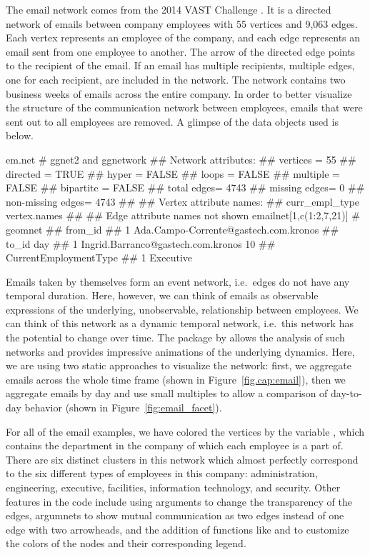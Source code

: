The email network comes from the 2014 VAST Challenge \citep{emailnet}. It is a directed network of emails between company employees with 55 vertices and 9,063 edges. Each vertex represents an employee of the company, and each edge represents an email sent from one employee to another. The arrow of the directed edge points to the recipient of the email. If an email has multiple recipients, multiple edges, one for each recipient, are included in the network. The network contains two business weeks of emails across the entire company. In order to better visualize the structure of the communication network between employees, emails that were sent out to all employees are removed. A glimpse of the data objects used is below. 

\begin{example}
em.net # ggnet2 and ggnetwork
##  Network attributes:
##   vertices = 55 
##   directed = TRUE 
##   hyper = FALSE 
##   loops = FALSE 
##   multiple = FALSE 
##   bipartite = FALSE 
##   total edges= 4743 
##     missing edges= 0 
##     non-missing edges= 4743 
## 
##  Vertex attribute names: 
##     curr_empl_type vertex.names 
## 
##  Edge attribute names not shown
emailnet[1,c(1:2,7,21)] # geomnet
##                                 from_id
## 1 Ada.Campo-Corrente@gastech.com.kronos
##                                to_id day
## 1 Ingrid.Barranco@gastech.com.kronos  10
##   CurrentEmploymentType
## 1             Executive


\end{example}

Emails taken by themselves form an event network, i.e.\ edges do not have any temporal duration. Here, however, we can think of emails as observable expressions of the underlying, unobservable, relationship between employees. We can think of this network as a dynamic temporal network, i.e.\ this network has the potential to change over time. The  package by \cite{ndtv} allows the analysis of such networks and provides impressive animations of the underlying dynamics. 
Here, we are using two static approaches to visualize the network: first, we aggregate emails across the whole time frame (shown in Figure~\ref{fig.cap:email}), then we  
aggregate emails by day and use small multiples to allow a comparison of day-to-day behavior (shown in Figure~\ref{fig:email_facet}).

For all of the email examples, we have colored the vertices by the variable , which contains the department in the company of which each employee is a part of. There are six distinct clusters in this network which almost perfectly correspond to the six different types of employees in this company: administration, engineering, executive, facilities, information technology, and security. Other features in the code include using  arguments to change the transparency of the edges,  argumnets to show mutual communication as two edges instead of one edge with two arrowheads, and the addition of  functions like  and  to customize the colors of the nodes and their corresponding legend. 

